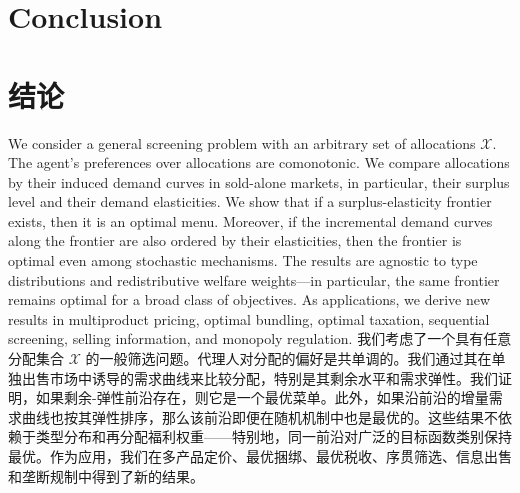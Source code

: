 \documentclass[12pt,letterpaper]{article}
\newenvironment{original}{\color{black}\noindent}{}
\newenvironment{translation}{\color{blue}\noindent}{}
\theoremstyle{plain}
\theoremstyle{definition}
\theoremstyle{remark}
\renewcommand{\1}{\mathds{1}}
\theoremstyle{definition}
\begin{document}
\begin{original}
\section{Conclusion}\label{sec:conclude}
\end{original}
\begin{translation}
\section{结论}\label{sec:conclude}
\end{translation}

\begin{original}
We consider a general screening problem with an arbitrary set of allocations $\mathcal{X}$. The agent's preferences over allocations are comonotonic. We compare allocations by their induced demand curves in sold-alone markets, in particular, their surplus level and their demand elasticities. We show that if a surplus-elasticity frontier exists, then it is an optimal menu. Moreover, if the incremental demand curves along the frontier are also ordered by their elasticities, then the frontier is optimal even among stochastic mechanisms. The results are agnostic to type distributions and redistributive welfare weights---in particular, the same frontier remains optimal for a broad class of objectives. As applications, we derive new results in multiproduct pricing, optimal bundling, optimal taxation, sequential screening, selling information, and monopoly regulation.
\end{original}
\begin{translation}
我们考虑了一个具有任意分配集合 $\mathcal{X}$ 的一般筛选问题。代理人对分配的偏好是共单调的。我们通过其在单独出售市场中诱导的需求曲线来比较分配，特别是其剩余水平和需求弹性。我们证明，如果剩余-弹性前沿存在，则它是一个最优菜单。此外，如果沿前沿的增量需求曲线也按其弹性排序，那么该前沿即便在随机机制中也是最优的。这些结果不依赖于类型分布和再分配福利权重——特别地，同一前沿对广泛的目标函数类别保持最优。作为应用，我们在多产品定价、最优捆绑、最优税收、序贯筛选、信息出售和垄断规制中得到了新的结果。
\end{translation}

\newpage
\renewcommand*{\bibfont}{\small}
\setlength\bibsep{0pt}
\end{document}
